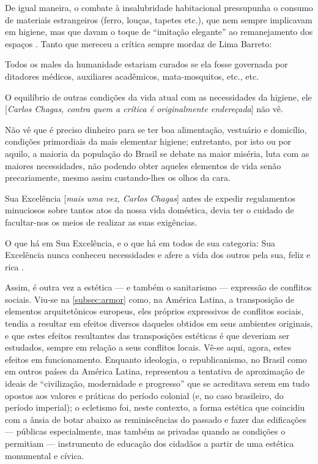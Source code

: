 De igual maneira, o combate à insalubridade habitacional pressupunha o consumo de materiais estrangeiros (ferro, louças, tapetes etc.), que nem sempre implicavam em higiene, mas que davam o toque de ``imitação elegante'' ao remanejamento dos espaços \cite[p.~38]{sodre_terreiro_1988}. Tanto que mereceu a crítica sempre mordaz de Lima Barreto:

\begin{citacao}
Todos os males da humanidade estariam curados se ela fosse governada por ditadores médicos, auxiliares acadêmicos, mata-mosquitos, etc., etc.

O equilíbrio de outras condições da vida atual com as necessidades da higiene, ele [\textit{Carlos Chagas, contra quem a crítica é originalmente endereçada}] não vê.

Não vê que é preciso dinheiro para se ter boa alimentação, vestuário e domicílio, condições primordiais da mais elementar higiene; entretanto, por isto ou por aquilo, a maioria da população do Brasil se debate na maior miséria, luta com as maiores necessidades, não podendo obter aqueles elementos de vida senão precariamente, mesmo assim custando-lhes os olhos da cara.

Sua Excelência [\textit{mais uma vez, Carlos Chagas}] antes de expedir regulamentos minuciosos sobre tantos atos da nossa vida doméstica, devia ter o cuidado de facultar-nos os meios de realizar as suas exigências.

O que há em Sua Excelência, e o que há em todos de sua categoria: Sua Excelência nunca conheceu necessidades e afere a vida dos outros pela sua, feliz e rica \cite{limabarreto_higienistas_2001}.
\end{citacao}

Assim, é outra vez a estética --- e também o sanitarismo --- expressão de conflitos sociais. Viu-se na \autoref{subsec:armor} como, na América Latina, a transposição de elementos arquitetônicos europeus, eles próprios expressivos de conflitos sociais, tendia a resultar em efeitos diversos daqueles obtidos em seus ambientes originais, e que estes efeitos resultantes das transposições estéticas é que deveriam ser estudados, sempre em relação a seus conflitos locais. Vê-se aqui, agora, estes efeitos em funcionamento. Enquanto ideologia, o republicanismo, no Brasil como em outros países da América Latina, representou a tentativa de aproximação de ideais de ``civilização, modernidade e progresso'' que se acreditava serem em tudo opostos aos valores e práticas do período colonial (e, no caso brasileiro, do período imperial); o ecletismo foi, neste contexto, a forma estética que coincidiu com a ânsia de botar abaixo as reminiscências do passado e fazer das edificações --- públicas especialmente, mas também as privadas quando as condições o permitiam --- instrumento de educação dos cidadãos a partir de uma estética monumental e cívica. 

